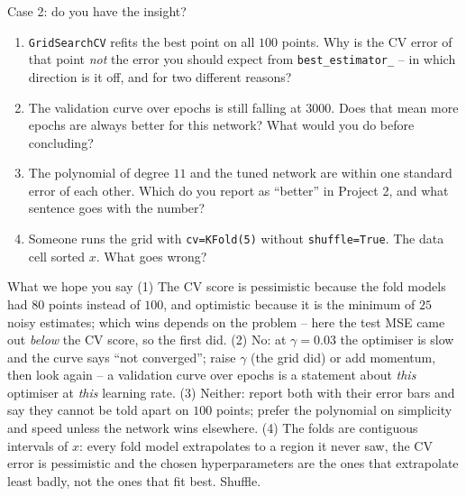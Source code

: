 \documentclass[10pt,aspectratio=169]{beamer}
\newcounter{insight}
\begin{document}
\begin{frame}{Case 2: do you have the insight?}
\small
\begin{enumerate}
  \item \texttt{GridSearchCV} refits the best point on all $100$ points.
        Why is the CV error of that point \emph{not} the error you should
        expect from \texttt{best\_estimator\_} -- in which direction is it
        off, and for two different reasons?
  \item The validation curve over epochs is still falling at $3000$.  Does
        that mean more epochs are always better for this network?  What
        would you do before concluding?
  \item The polynomial of degree $11$ and the tuned network are within one
        standard error of each other.  Which do you report as ``better'' in
        Project 2, and what sentence goes with the number?
  \item Someone runs the grid with \texttt{cv=KFold(5)} without
        \texttt{shuffle=True}.  The data cell sorted $x$.  What goes wrong?
\end{enumerate}
\pause
\begin{block}{What we hope you say}
\footnotesize
(1) The CV score is pessimistic because the fold models had $80$ points
instead of $100$, and optimistic because it is the minimum of $25$ noisy
estimates; which wins depends on the problem -- here the test MSE came out
\emph{below} the CV score, so the first did.  (2) No: at $\gamma=0.03$ the
optimiser is slow and the curve says ``not converged''; raise $\gamma$ (the
grid did) or add momentum, then look again -- a validation curve over
epochs is a statement about \emph{this} optimiser at \emph{this} learning
rate.  (3) Neither: report both with their error bars and say they cannot
be told apart on $100$ points; prefer the polynomial on simplicity and
speed unless the network wins elsewhere.  (4) The folds are contiguous
intervals of $x$: every fold model extrapolates to a region it never saw,
the CV error is pessimistic and the chosen hyperparameters are the ones
that extrapolate least badly, not the ones that fit best.  Shuffle.
\end{block}
\end{frame}
\end{document}
